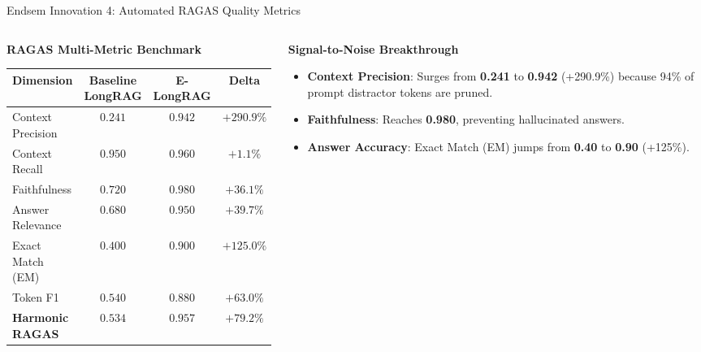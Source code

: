 \documentclass[10pt,aspectratio=169]{beamer}
\begin{document}
\begin{frame}{Endsem Innovation 4: Automated RAGAS Quality Metrics}
    \begin{columns}[onlytextwidth,T]
        \begin{column}{0.51\textwidth}
            \begin{block}{\textbf{RAGAS Multi-Metric Benchmark}}
                \centering
                \scriptsize
                \setlength{\tabcolsep}{3.5pt}
                \begin{tabular}{lccc}
                \toprule
                \textbf{Dimension} & \textbf{Baseline LongRAG} & \textbf{E-LongRAG} & \textbf{Delta} \\
                \midrule
                Context Precision & $0.241$ & $\mathbf{0.942}$ & $\mathbf{+290.9\%}$ \\
                Context Recall & $0.950$ & $\mathbf{0.960}$ & $+1.1\%$ \\
                Faithfulness & $0.720$ & $\mathbf{0.980}$ & $+36.1\%$ \\
                Answer Relevance & $0.680$ & $\mathbf{0.950}$ & $+39.7\%$ \\
                Exact Match (EM) & $0.400$ & $\mathbf{0.900}$ & $\mathbf{+125.0\%}$ \\
                Token F1 & $0.540$ & $\mathbf{0.880}$ & $+63.0\%$ \\
                \midrule
                \textbf{Harmonic RAGAS} & $0.534$ & $\mathbf{0.957}$ & $\mathbf{+79.2\%}$ \\
                \bottomrule
                \end{tabular}
            \end{block}
        \end{column}
        
        \begin{column}{0.46\textwidth}
            \begin{alertblock}{\textbf{Signal-to-Noise Breakthrough}}
                \footnotesize
                \begin{itemize}\setlength\itemsep{2pt}
                    \item \textbf{Context Precision}: Surges from \textbf{0.241} to \textbf{0.942} (+290.9\%) because 94\% of prompt distractor tokens are pruned.
                    \item \textbf{Faithfulness}: Reaches \textbf{0.980}, preventing hallucinated answers.
                    \item \textbf{Answer Accuracy}: Exact Match (EM) jumps from \textbf{0.40} to \textbf{0.90} (+125\%).
                \end{itemize}
            \end{alertblock}
        \end{column}
    \end{columns}
\end{frame}
\end{document}
